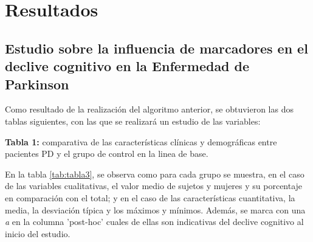 \chapter{Resultados}


\section{Estudio sobre la influencia de marcadores en el declive cognitivo en la Enfermedad de Parkinson}

Como resultado de la realización del algoritmo anterior, se obtuvieron las dos tablas siguientes, con las que se realizará un estudio de las variables:

\begin{description}
	\item{\textbf{Tabla 1:}} comparativa de las características clínicas y demográficas entre pacientes PD y el grupo de control en la linea de base.
	
	En la tabla \ref{tab:tabla3}, se observa como para cada grupo se muestra, en el caso de las variables cualitativas, el valor medio de sujetos y mujeres y su porcentaje en comparación con el total; y en el caso de las características cuantitativa, la media, la desviación típica y los máximos y mínimos. Además, se marca con una \textit{a} en la columna 'post-hoc' cuales de ellas son indicativas del declive cognitivo al inicio del estudio.
	

\end{description}
